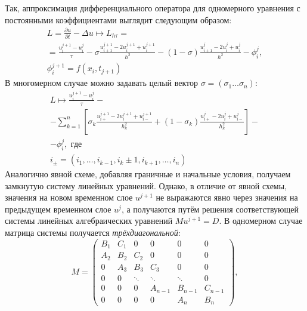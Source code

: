 Так, аппроксимация дифференциального оператора для одномерного уравнения с постоянными коэффициентами выглядит следующим образом:
\begin{multline*}
    L = \frac{\partial u}{\partial t} - \Delta u \mapsto 
    L_{h\tau} =\\
    = \frac{u_i^{j + 1} - u_i^j}{\tau} -
    \sigma\frac{u_{i + 1}^{j + 1} - 2u_i^{j + 1} + u_i^{j + 1}}{h^2}  -
    (1 - \sigma)\frac{u_{i + 1}^j - 2u_i^j + u_i^j}{h^2} - \phi_i^j,\\
    \phi_i^{j + 1} = f(x_i, t_{j + 1})
\end{multline*}
В многомерном случае можно задавать целый вектор $\sigma = (\sigma_1 \ldots \sigma_n)$:
\begin{multline*}
    L \mapsto 
    \frac{u_i^{j + 1} - u_i^j}{\tau} - \\
    - \sum\limits_{k = 1}^{n} \left[ 
        \sigma_k\frac{u_{i+}^{j + 1} - 2u_i^{j + 1} + u_{i-}^{j + 1}}{h_k^2} +
        (1 - \sigma_k) \frac{u_{i+}^j - 2u_i^j + u_{i-}^j}{h_k^2}
    \right] -\\
    - \phi_i^j,\text{ где }\\
    i_{\pm} = (i_1, \ldots, i_{k - 1}, i_k \pm 1, i_{k + 1}, \ldots, i_n)
\end{multline*}
Аналогично явной схеме, добавляя граничные и начальные условия, получаем замкнутую систему линейных уравнений.
Однако, в отличие от явной схемы, значения на новом временном слое $u^{j + 1}$ не выражаются явно через значения на предыдущем временном слое $u^{j}$, а получаются путём решения соответствующей системы линейных алгебраических уравнений $M u^{j + 1} = D$.
В одномерном случае матрица системы получается \emph{трёхдиагональной}:
\begin{equation*}
    M = \begin{pmatrix}
        B_1 & C_1 & 0 & 0 & 0 & 0 \\
        A_2 & B_2 & C_2 & 0 & 0 & 0 \\
        0 & A_3 & B_3 & C_3 & 0 & 0 \\
        0 & 0 & \ddots & \ddots & \ddots & 0\\
        0 & 0 & 0 & A_{n-1} & B_{n-1} & C_{n-1}\\
        0 & 0 & 0 & 0 & A_{n} & B_{n}
    \end{pmatrix},
\end{equation*}
